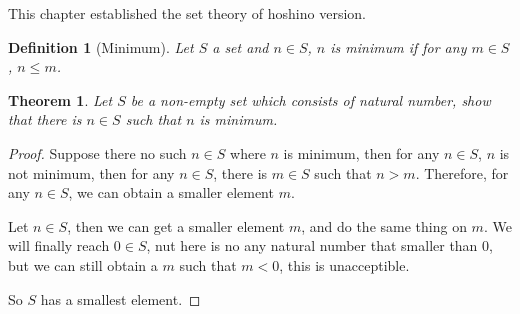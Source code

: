 \documentclass[14pt]{extarticle}
\newtheorem{theorem}{Theorem}[section]
\newtheorem{definition}{Definition}[section]
\newcommand{\1}{\{e\}}
\begin{document}
This chapter established the set theory of hoshino version.

\begin{definition}[Minimum]
  Let $S$ a set and $n \in S$, $n$ is minimum if
  for any $m \in S$, $n \leq m$.
\end{definition}

\begin{theorem}
  Let $S$ be a non-empty set which consists of natural number,
  show that there is $n \in S$ such that $n$ is minimum.
\end{theorem}
\begin{proof}
  Suppose there no such $n \in S$ where $n$ is minimum, then
  for any $n \in S$, $n$ is not minimum,
  then for any $n \in S$, there is $m \in S$ such that $n > m$.
  Therefore, for any $n \in S$, we can obtain a smaller element $m$.

  Let $n \in S$, then we can get a smaller element $m$,
  and do the same thing on $m$. We will finally reach $0 \in S$,
  nut here is no any natural number that smaller than $0$,
  but we can still obtain a $m$ such that $m < 0$,
  this is unacceptible.

  So $S$ has a smallest element.
\end{proof}
\end{document}
